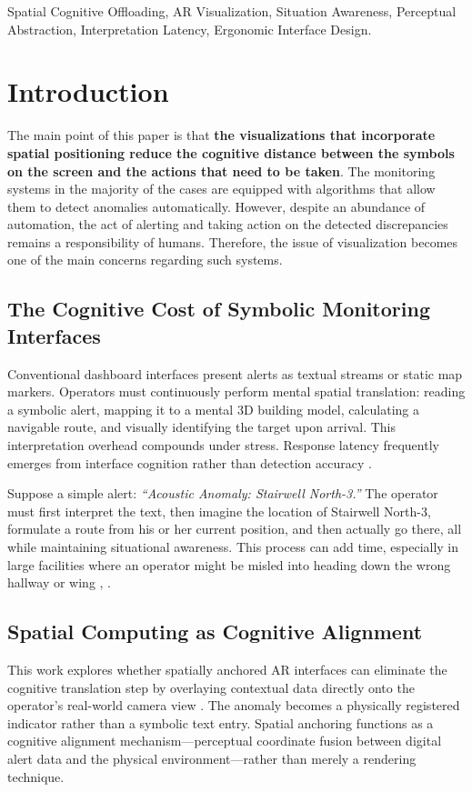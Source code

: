 \documentclass[conference]{IEEEtran}
\begin{document}
\begin{IEEEkeywords}
Spatial Cognitive Offloading, AR Visualization, Situation Awareness, Perceptual Abstraction, Interpretation Latency, Ergonomic Interface Design.
\end{IEEEkeywords}

\section{Introduction}

The main point of this paper is that \textbf{the visualizations that incorporate spatial positioning reduce the cognitive distance between the symbols on the screen and the actions that need to be taken}. The monitoring systems in the majority of the cases are equipped with algorithms that allow them to detect anomalies automatically. However, despite an abundance of automation, the act of alerting and taking action on the detected discrepancies remains a responsibility of humans. Therefore, the issue of visualization becomes one of the main concerns regarding such systems.

\subsection{The Cognitive Cost of Symbolic Monitoring Interfaces}
Conventional dashboard interfaces present alerts as textual streams or static map markers. Operators must continuously perform mental spatial translation: reading a symbolic alert, mapping it to a mental 3D building model, calculating a navigable route, and visually identifying the target upon arrival. This interpretation overhead compounds under stress. Response latency frequently emerges from interface cognition rather than detection accuracy \cite{b2, b29}.

Suppose a simple alert: \textit{“Acoustic Anomaly: Stairwell North-3.”} The operator must first interpret the text, then imagine the location of Stairwell North-3, formulate a route from his or her current position, and then actually go there, all while maintaining situational awareness. This process can add time, especially in large facilities where an operator might be misled into heading down the wrong hallway or wing \cite{b3}, \cite{b30}.

\subsection{Spatial Computing as Cognitive Alignment}
This work explores whether spatially anchored AR interfaces can eliminate the cognitive translation step by overlaying contextual data directly onto the operator's real-world camera view \cite{b31}. The anomaly becomes a physically registered indicator rather than a symbolic text entry. Spatial anchoring functions as a cognitive alignment mechanism---perceptual coordinate fusion between digital alert data and the physical environment---rather than merely a rendering technique.
\end{document}
